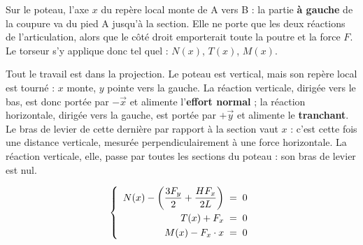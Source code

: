 \BesoinPlace{300bp}

Sur le poteau, l'axe $x$ du repère local monte de A vers B : la partie \textbf{à gauche} de la coupure va du pied A jusqu'à la section. Elle ne porte que les deux réactions de l'articulation, alors que le côté droit emporterait toute la poutre et la force $F$. Le torseur s'y applique donc tel quel : $N(x)$, $T(x)$, $M(x)$.

Tout le travail est dans la projection. Le poteau est vertical, mais son repère local est tourné : $x$ monte, $y$ pointe vers la gauche. La réaction verticale, dirigée vers le bas, est donc portée par $-\vec{x}$ et alimente l'\textbf{effort normal} ; la réaction horizontale, dirigée vers la gauche, est portée par $+\vec{y}$ et alimente le \textbf{tranchant}. Le bras de levier de cette dernière par rapport à la section vaut $x$ : c'est cette fois une distance verticale, mesurée perpendiculairement à une force horizontale. La réaction verticale, elle, passe par toutes les sections du poteau : son bras de levier est nul.

\noindent\begin{minipage}[c]{0.56\textwidth}
\[ \left\{\begin{array}{r@{\;\;=\;\;}l}
  N(x) - \left(\dfrac{3F_y}{2}+\dfrac{HF_x}{2L}\right) & 0\\[9pt]
  T(x) + F_x & 0\\[3pt]
  M(x) - F_x\cdot x & 0
\end{array}\right. \]
\end{minipage}\hfill
\begin{minipage}[c]{0.42\textwidth}
\centering
{}
\end{minipage}


